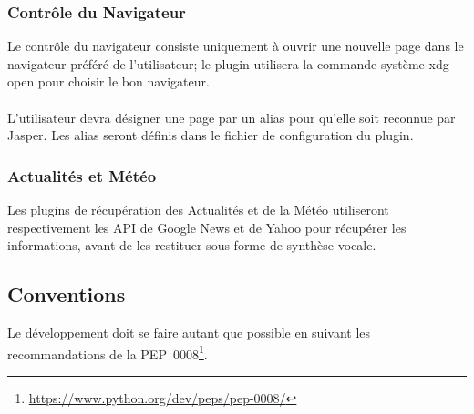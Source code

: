 \documentclass[12pt]{article}
\begin{document}
		\subsubsection{Contrôle du Navigateur}
		Le contrôle du navigateur consiste uniquement à ouvrir une nouvelle page dans le navigateur préféré de l'utilisateur; le plugin utilisera la commande système xdg-open pour choisir le bon navigateur.
		
		\paragraph{}
		L'utilisateur devra désigner une page par un alias pour qu'elle soit reconnue par Jasper. Les alias seront définis dans le fichier de configuration du plugin.
		
		\subsubsection{Actualités et Météo}
		Les plugins de récupération des Actualités et de la Météo utiliseront respectivement les API de Google News et de Yahoo pour récupérer les informations, avant de les restituer sous forme de synthèse vocale.

		\subsection{Conventions}
		Le développement doit se faire autant que possible en suivant les recommandations de la PEP~0008\footnote{\url{https://www.python.org/dev/peps/pep-0008/}}.
\end{document}
